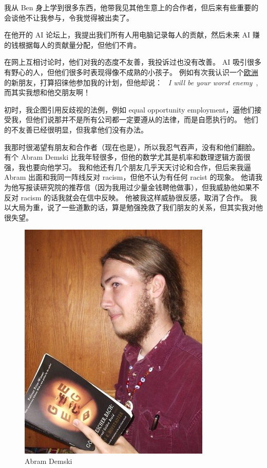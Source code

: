 \documentclass[12pt]{report}
\newcommand{\speechEn}[1]{\textrm{\textit{\ #1\ }}}
\begin{document}
{我从 Ben 身上学到很多东西，他带我见其他生意上的合作者，但后来有些重要的会谈他不让我参与，令我觉得被出卖了。

在他开的 AI 论坛上，我提出我们所有人用电脑记录每人的贡献，然后未来 AI 赚的钱根据每人的贡献量分配，但他们不肯。

在网上互相讨论时，他们对我的态度不友善，我投诉过也没有改善。  AI 吸引很多有野心的人，但他们很多时表现得像不成熟的小孩子。  例如有次我认识一个\uline{欧洲}的新朋友，打算招徕他参加我的计划，但他却说： \speechEn{I will be your worst enemy}, 而其实我想和他交朋友啊！

初时，我企图引用反歧视的法例，例如 equal opportunity employment，逼他们接受我，但他们说那并不是所有公司都一定要遵从的法律，而是自愿执行的。 他们的不友善已经很明显，但我拿他们没有办法。

我那时很渴望有朋友和合作者（现在也是），所以我忍气吞声，没有和他们翻脸。 有个 Abram Demski 比我年轻很多，但他的数学尤其是机率和数理逻辑方面很强，我也要向他学习。 我和他还有几个朋友几乎天天讨论和合作，但后来我逼 Abram 出面和我同一阵线反对 racism，但他不认为有任何 racist 的现象。 他请我为他写报读研究院的推荐信（因为我用过少量金钱聘他做事），但我威胁他如果不反对 racism 的话我就会在信中反映。 他被我这样威胁很反感，取消了合作。 我以大局为重，说了一些道歉的话，算是勉强挽救了我们朋友的关系，但其实我对他很失望。

\begin{figure}[H]
\centering
\includegraphics[scale=0.4]{AbramDemski.jpg}
\caption*{Abram Demski}
\end{figure}

}
\end{document}
